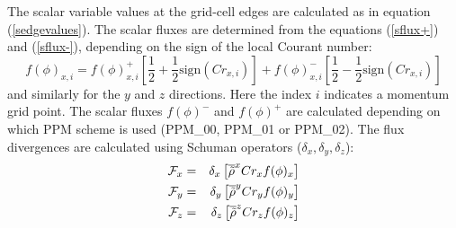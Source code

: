 The scalar variable values at the grid-cell edges are calculated as in
equation (\ref{sedgevalues}). The scalar fluxes are determined from the
equations (\ref{sflux+}) and (\ref{sflux-}), depending on the sign of the
local Courant number:
\begin{equation}
f(\phi)_{x,i} = f(\phi)^{+}_{x,i} \left [ \frac{1}{2} +
  \frac{1}{2}\mathrm{sign}(Cr_{x,i}) \right ] + 
f(\phi)^{-}_{x,i} \left [ \frac{1}{2} -
  \frac{1}{2}\mathrm{sign}(Cr_{x,i}) \right ] 
\end{equation}
and similarly for the $y$ and $z$ directions. Here the index $i$
indicates a momentum grid point. The scalar fluxes $f(\phi)^{-}$ and
$f(\phi)^{+}$ are calculated depending on which PPM scheme is used
(PPM\_00, PPM\_01 or PPM\_02). The flux divergences are calculated using
Schuman operators ($\delta_{x}, \delta_{y}, \delta_{z}$):
\begin{eqnarray}
\mathcal{F}_{x} &=& \delta_{x}\left [\overline{\tilde{\rho}}^{x} Cr_{x} f(\phi)_{x}
\right] \\
\mathcal{F}_{y} &=& \delta_{y}\left [\overline{\tilde{\rho}}^{y} Cr_{y} f(\phi)_{y}
\right] \\
\mathcal{F}_{z} &=& \delta_{z}\left [\overline{\tilde{\rho}}^{z} Cr_{z} f(\phi)_{z}
\right]
\end{eqnarray}



